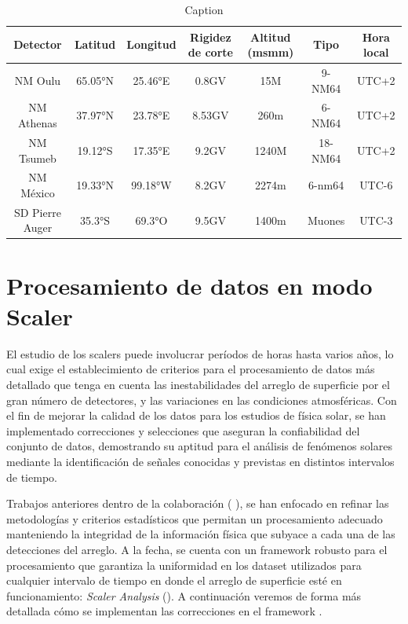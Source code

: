 \begin{table}[ht]
\centering
\caption{Caption}
\small
\begin{tabular}{ccccccc}
\toprule
\textbf{Detector} & \textbf{Latitud} & \textbf{Longitud} & \textbf{Rigidez de corte} & \textbf{Altitud (msmm)} & \textbf{Tipo} & \textbf{Hora local} \\
\midrule
NM Oulu & \ang{65.05}N & \ang{25.46}E & 0.8GV & 15M & 9-NM64 & UTC+2 \\
NM Athenas & \ang{37.97}N & \ang{23.78}E & 8.53GV & 260m & 6-NM64 & UTC+2 \\
NM Tsumeb & \ang{19.12}S & \ang{17.35}E & 9.2GV & 1240M & 18-NM64 & UTC+2 \\
NM México & \ang{19.33}N & \ang{99.18}W & 8.2GV & 2274m & 6-nm64 & UTC-6 \\
SD Pierre Auger& \ang{35.3}S & \ang{69.3}O & 9.5GV & 1400m & Muones & UTC-3 \\
\bottomrule
\end{tabular}
\label{tab:my_label}
\end{table}


\section{Procesamiento de datos en modo Scaler}

El estudio de los scalers puede involucrar períodos de horas hasta varios años, lo cual exige el establecimiento de criterios para el procesamiento de datos más detallado que tenga en cuenta las inestabilidades del arreglo de superficie por el gran número de detectores, y las variaciones en las condiciones atmosféricas. Con el fin de mejorar la calidad de los datos para los estudios de física solar, se han implementado correcciones y selecciones que aseguran la confiabilidad del conjunto de datos, demostrando su aptitud para el análisis de fenómenos solares mediante la identificación de señales conocidas y previstas en distintos intervalos de tiempo.

Trabajos anteriores dentro de la colaboración ( \cite{bertou_2011}  \cite{asorey} \cite{masias_2017} \cite{Martin_Schimassek2022}), se han enfocado en refinar las metodologías y criterios estadísticos que permitan un procesamiento adecuado manteniendo la integridad de la información física que subyace a cada una de las detecciones del arreglo. A la fecha, se cuenta con un framework robusto para el procesamiento que garantiza la uniformidad en los dataset utilizados para cualquier intervalo de tiempo en donde el arreglo de superficie esté en funcionamiento: \textit{Scaler Analysis}  (\cite{martin_ICRC}). A continuación veremos de forma más detallada cómo se implementan las correcciones en el framework .


